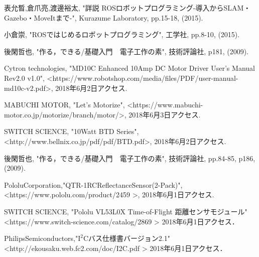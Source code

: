 \documentclass[11pt,a4j]{jarticle}
\begin{document}
\newpage


\newpage

\clearpage

\newpage

\newpage

\newpage

\newpage


\newpage
\begin{thebibliography}{9}
    表允晳,倉爪亮,渡邊裕太, "詳説 ROSロボットプログラミング-導入からSLAM・Gazebo・MoveItまで-", 
    Kurazume Laboratory, pp.15-18, (2015).

    小倉崇, "ROSではじめるロボットプログラミング", 工学社, pp.8-10, (2015).
  
  後閑哲也, "作る，できる/基礎入門　電子工作の素", 技術評論社, p181, (2009).
  
  Cytron technologies, "MD10C Enhanced 10Amp DC Motor Driver User's Manual Rev2.0 v1.0", 
  \textless https://www.robotshop.com/media/files/PDF/user-manual-md10c-v2.pdf\textgreater , 2018年6月2日アクセス.
  
  MABUCHI MOTOR, "Let's Motorize", 
  \textless https://www.mabuchi-motor.co.jp/motorize/branch/motor/\textgreater , 2018年6月3日アクセス.
  
  SWITCH SCIENCE, "10Watt BTD Series", 
  \textless http://www.bellnix.co.jp/pdf/pdf/BTD.pdf\textgreater , 2018年6月2日アクセス.
  
  後閑哲也, "作る，できる/基礎入門　電子工作の素", 技術評論社, pp.84-85, p186, (2009).
  
   Pololu\quad Corporation,\quad "QTR-1RC\quad Reflectance\quad Sensor(2-Pack)",
   \textless https://www.pololu.com/product/2459 \textgreater , 2018年6月1日アクセス.
   
  SWITCH SCIENCE, "Pololu VL53L0X Time-of-Flight 距離センサモジュール"
  \textless https://www.switch-science.com/catalog/2869 \textgreater
  2018年6月1日アクセス．
  
  Philips\quad Semiconductors,\quad "$\mathrm{I^2C}$\hspace{0.5em}バス仕様書バージョン2.1"　　　　　　　　　　
  \textless http://ekousaku.web.fc2.com/doc/I2C.pdf \textgreater
  \quad 2018年6月1日アクセス．
  

\end{thebibliography}
\end{document}
